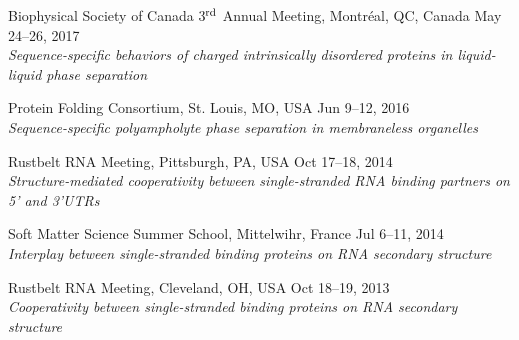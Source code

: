 \documentclass[11pt]{../yhlcv}
\begin{document}
\begin{etaremune}[leftmargin=0.26in]
\item Biophysical Society of Canada 3$^{\rm rd}$ Annual Meeting, Montr\'{e}al, QC, Canada \hfill {May 24--26, 2017}\\
	{\it Sequence-specific behaviors of charged intrinsically disordered proteins in liquid-liquid phase separation}

\item Protein Folding Consortium, St. Louis, MO, USA \hfill {Jun 9--12, 2016}\\
	{\it Sequence-specific polyampholyte phase separation in membraneless organelles}

\item Rustbelt RNA Meeting, Pittsburgh, PA, USA \hfill {Oct 17--18, 2014}\\
	{\it Structure-mediated cooperativity between single-stranded RNA binding partners on 5' and 3'UTRs}

\item	Soft Matter Science Summer School, Mittelwihr, France \hfill {Jul 6--11, 2014}\\
	{\it Interplay between single-stranded binding proteins on RNA secondary structure}

\item Rustbelt RNA Meeting, Cleveland, OH, USA \hfill {Oct 18--19, 2013}\\
	{\it Cooperativity between single-stranded binding proteins on RNA secondary structure}

\end{etaremune}
\end{document}
